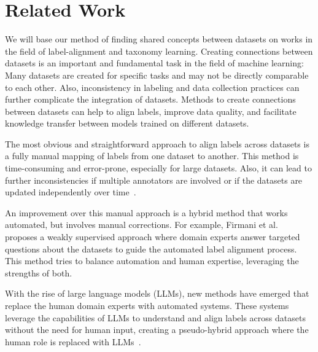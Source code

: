 \chapter{Related Work}


We will base our method of finding shared concepts between datasets on works
in the field of label-alignment and taxonomy learning.
Creating connections between datasets is an important and fundamental task
in the field of machine learning: Many datasets are created for specific tasks
and may not be directly comparable to each other. Also, inconsistency in labeling
and data collection practices can further complicate the integration of datasets.
Methods to create connections between datasets can help to align labels, improve
data quality, and facilitate knowledge transfer between models trained on different
datasets.

The most obvious and straightforward approach to align labels across datasets
is a fully manual mapping of labels from one dataset to another.
This method is time-consuming and error-prone, especially for large datasets.
Also, it can lead to further inconsistencies if multiple annotators are involved
or if the datasets are updated independently over time~\cite{bordea_semeval-2016_2016,jurgens_semeval-2016_2016,yang_literature-driven_2013}.

An improvement over this manual approach is a hybrid method that works
automated, but involves manual corrections.
For example, Firmani et al.~\cite{firmani_building_2024} proposes a weakly supervised
approach where domain experts answer targeted questions about the datasets
to guide the automated label alignment process.
This method tries to balance automation and human expertise, leveraging the strengths of both.

With the rise of large language models (LLMs), new methods have emerged
that replace the human domain experts with automated systems.
These systems leverage the capabilities of LLMs to understand and align labels
across datasets without the need for human input,
creating a pseudo-hybrid approach where the human role is replaced with LLMs~\cite{kargupta_taxoadapt_2025,chen_prompting_2023,gunn_creating_2024}.


